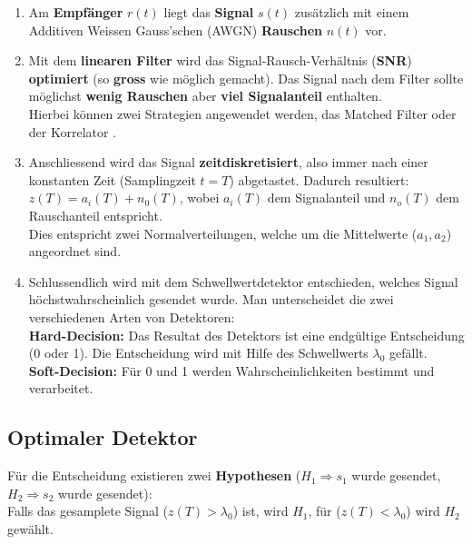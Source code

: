 \begin{enumerate}
  \item Am \textbf{Empfänger} $r(t)$ liegt das \textbf{Signal} $s(t)$ zusätzlich mit einem Additiven 
  		Weissen Gauss'schen (AWGN) \textbf{Rauschen} $n(t)$ vor.
  \item Mit dem \textbf{linearen Filter} wird das Signal-Rausch-Verhältnis (\textbf{SNR})
		\textbf{optimiert} (so \textbf{gross} wie möglich gemacht). Das Signal nach dem Filter sollte
		möglichst \textbf{wenig Rauschen} aber \textbf{viel Signalanteil} enthalten. \\
		Hierbei können zwei Strategien angewendet werden, das Matched Filter 
		 oder der Korrelator
		.
  \item Anschliessend wird das Signal \textbf{zeitdiskretisiert}, also immer nach einer konstanten Zeit
  		(Samplingzeit $t = T$) abgetastet. Dadurch resultiert: $z(T) = a_i(T) + n_0(T)$, wobei $a_i(T)$
  		dem Signalanteil und $n_o(T)$ dem Rauschanteil entspricht. \\
  		Dies entspricht zwei Normalverteilungen, welche um die Mittelwerte ($a_1, a_2$) angeordnet sind.
  \item Schlussendlich wird mit dem Schwellwertdetektor entschieden, welches Signal
  		höchstwahrscheinlich gesendet wurde. Man unterscheidet die zwei verschiedenen Arten von
  		Detektoren: \\ \textbf{Hard-Decision:} Das Resultat des Detektors ist eine endgültige
  		Entscheidung (0 oder 1). Die Entscheidung wird mit Hilfe des Schwellwerts $\lambda_0$ gefällt.\\ 
  		\textbf{Soft-Decision:} Für 0 und 1 werden Wahrscheinlichkeiten bestimmt und verarbeitet.
\end{enumerate}

\subsection{Optimaler Detektor}
	Für die Entscheidung existieren zwei \textbf{Hypothesen} ($H_1 \Rightarrow s_1$ wurde gesendet, 
	$H_2 \Rightarrow s_2$ wurde gesendet): \\ 
	Falls das gesamplete Signal ($z(T) > \lambda_0$) ist, wird $H_1$, 
	für ($z(T) < \lambda_0$) wird $H_2$ gewählt. \\

